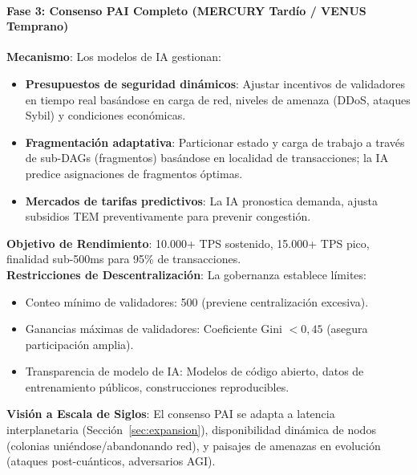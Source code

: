 \documentclass[11pt]{article}
\begin{document}
\paragraph{Fase 3: Consenso PAI Completo (MERCURY Tardío / VENUS Temprano)}
\textbf{Mecanismo}: Los modelos de IA gestionan:
\begin{itemize}[noitemsep]
  \item \textbf{Presupuestos de seguridad dinámicos}: Ajustar incentivos de validadores en tiempo real basándose en carga de red, niveles de amenaza (DDoS, ataques Sybil) y condiciones económicas.
  \item \textbf{Fragmentación adaptativa}: Particionar estado y carga de trabajo a través de sub-DAGs (fragmentos) basándose en localidad de transacciones; la IA predice asignaciones de fragmentos óptimas.
  \item \textbf{Mercados de tarifas predictivos}: La IA pronostica demanda, ajusta subsidios TEM preventivamente para prevenir congestión.
\end{itemize}
\textbf{Objetivo de Rendimiento}: 10.000+ TPS sostenido, 15.000+ TPS pico, finalidad sub-500ms para 95\% de transacciones.\\
\textbf{Restricciones de Descentralización}: La gobernanza establece límites:
\begin{itemize}[noitemsep]
  \item Conteo mínimo de validadores: 500 (previene centralización excesiva).
  \item Ganancias máximas de validadores: Coeficiente Gini $<0,45$ (asegura participación amplia).
  \item Transparencia de modelo de IA: Modelos de código abierto, datos de entrenamiento públicos, construcciones reproducibles.
\end{itemize}
\textbf{Visión a Escala de Siglos}: El consenso PAI se adapta a latencia interplanetaria (Sección~\ref{sec:expansion}), disponibilidad dinámica de nodos (colonias uniéndose/abandonando red), y paisajes de amenazas en evolución (ataques post-cuánticos, adversarios AGI).
\end{document}
